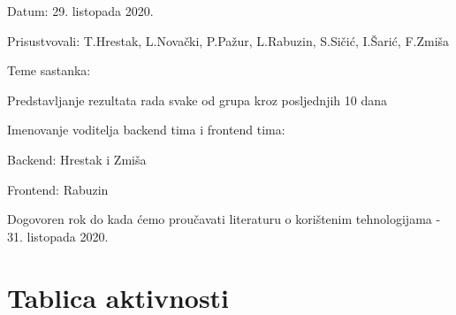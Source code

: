 \begin{packed_enum}
			\item[] \begin{packed_item}
				\item Datum: 29. listopada 2020.
				\item Prisustvovali: T.Hrestak, L.Novački, P.Pažur, L.Rabuzin, S.Sičić, I.Šarić, F.Zmiša
				\item Teme sastanka:
				\begin{packed_item}
					\item Predstavljanje rezultata rada svake od grupa kroz posljednjih 10 dana
					\item Imenovanje voditelja backend tima i frontend tima:
						\begin{packed_item}
						\item  Backend: Hrestak i Zmiša
						\item  Frontend: Rabuzin
					\end{packed_item}
					\item Dogovoren rok do kada ćemo proučavati literaturu o korištenim tehnologijama - 31. listopada 2020.
				\end{packed_item}
			
			\end{packed_item}
			
			
		\end{packed_enum}
		
		\eject
		\section*{Tablica aktivnosti}
		
